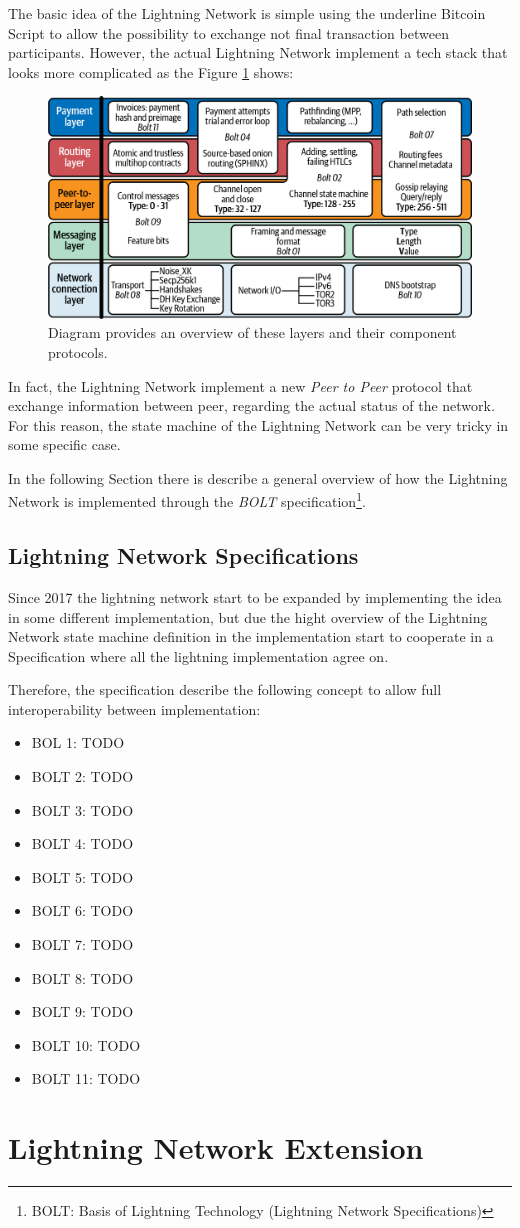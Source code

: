 The basic idea of the Lightning Network is simple using the underline Bitcoin Script to allow the possibility to exchange
not final transaction between participants. However, the actual Lightning Network implement a tech stack that looks more complicated
as the Figure \ref{fig:lightning-stack} shows:

\begin{figure}[h]
  \begin{center}
  \includegraphics[width=0.6\columnwidth]{imgs/mtln_0601.png}
  \end{center}
  \caption{Diagram provides an overview of these layers and their component protocols.}
  \label{fig:lightning-stack}
\end{figure}

In fact, the Lightning Network implement a new \emph{Peer to Peer} protocol that exchange information between
peer, regarding the actual status of the network. For this reason, the state machine of the Lightning Network
can be very tricky in some specific case.

In the following Section there is describe a general overview of how the Lightning Network is implemented through the
\emph{BOLT} specification\footnote{BOLT: Basis of Lightning Technology (Lightning Network Specifications)}.

\subsection{Lightning Network Specifications}

Since 2017 the lightning network start to be expanded by implementing the idea in some different implementation,
but due the hight overview of the Lightning Network state machine definition in \cite{lightning-network-paper}
the implementation start to cooperate in a Specification where all the lightning implementation agree on.

Therefore, the specification describe the following concept to allow full interoperability between implementation:

\begin{itemize}
  \item BOL 1: TODO
  \item BOLT 2: TODO
  \item BOLT 3: TODO
  \item BOLT 4: TODO
  \item BOLT 5: TODO
  \item BOLT 6: TODO
  \item BOLT 7: TODO
  \item BOLT 8: TODO
  \item BOLT 9: TODO
  \item BOLT 10: TODO
  \item BOLT 11: TODO
\end{itemize}

\section{Lightning Network Extension}
